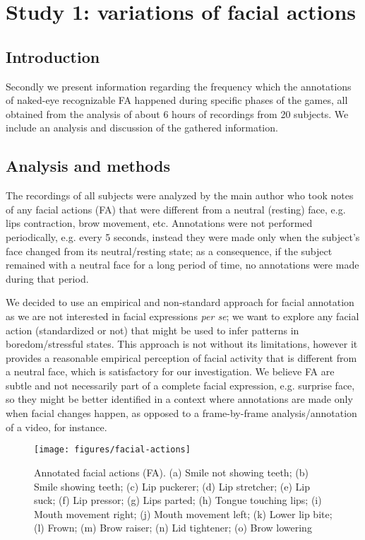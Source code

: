 \section{Study 1: variations of facial actions}

\subsection{Introduction}

Secondly we present information regarding the frequency which the annotations of naked-eye recognizable FA happened during specific phases of the games, all obtained from the analysis of about 6 hours of recordings from 20 subjects. We include an analysis and discussion of the gathered information.

\subsection{Analysis and methods}

The recordings of all subjects were analyzed by the main author who took notes of any facial actions (FA) that were different from a neutral (resting) face, e.g. lips contraction, brow movement, etc. Annotations were not performed periodically, e.g. every 5 seconds, instead they were made only when the subject's face changed from its neutral/resting state; as a consequence, if the subject remained with a neutral face for a long period of time, no annotations were made during that period.

We decided to use an empirical and non-standard approach for facial annotation as we are not interested in facial expressions \textit{per se}; we want to explore any facial action (standardized or not) that might be used to infer patterns in boredom/stressful states. This approach is not without its limitations, however it provides a reasonable empirical perception of facial activity that is different from a neutral face, which is satisfactory for our investigation. We believe FA are subtle and not necessarily part of a complete facial expression, e.g. surprise face, so they might be better identified in a context where annotations are made only when facial changes happen, as opposed to a frame-by-frame analysis/annotation of a video, for instance.

\begin{figure}[!t]
\centering
\texttt{[image: figures/facial-actions]}
\caption{Annotated facial actions (FA). (a) Smile not showing teeth; (b) Smile showing teeth; (c) Lip puckerer; (d) Lip stretcher; (e) Lip suck; (f) Lip pressor; (g) Lips parted; (h) Tongue touching lips; (i) Mouth movement right; (j) Mouth movement left; (k) Lower lip bite; (l) Frown; (m) Brow raiser; (n) Lid tightener; (o) Brow lowering}
\label{fig:fu}
\end{figure}

